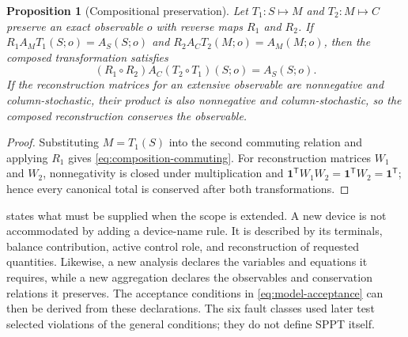 \documentclass[final,5p,times,twocolumn]{elsarticle}
\newtheorem{proposition}{Proposition}
\begin{document}
\begin{proposition}[Compositional preservation]
\label{prop:compositional-preservation}
Let $T_1:S\mapsto M$ and $T_2:M\mapsto C$ preserve an exact observable $o$
with reverse maps $R_1$ and $R_2$. If
$R_1A_M T_1(S;o)=A_S(S;o)$ and
$R_2A_C T_2(M;o)=A_M(M;o)$, then the composed transformation satisfies
\begin{equation}
 (R_1\circ R_2)A_C(T_2\circ T_1)(S;o)=A_S(S;o).
 \label{eq:composition-commuting}
\end{equation}
If the reconstruction matrices for an extensive observable are nonnegative and
column-stochastic, their product is also nonnegative and column-stochastic, so
the composed reconstruction conserves the observable.
\end{proposition}
\begin{proof}
Substituting $M=T_1(S)$ into the second commuting relation and applying $R_1$
gives \eqref{eq:composition-commuting}. For reconstruction matrices $W_1$ and
$W_2$, nonnegativity is closed under multiplication and
$\bm 1^{\mathsf T}W_1W_2=\bm 1^{\mathsf T}W_2=\bm 1^{\mathsf T}$; hence every
canonical total is conserved after both transformations.
\end{proof}

 states what must be supplied when the scope is extended.
A new device is not accommodated by adding a device-name rule. It is described
by its terminals, balance contribution, active control role, and reconstruction
of requested quantities. Likewise, a new analysis declares the variables and
equations it requires, while a new aggregation declares the observables and
conservation relations it preserves. The acceptance conditions in
\eqref{eq:model-acceptance} can then be derived from these declarations. The
six fault classes used later test selected violations of the general
conditions; they do not define SPPT itself.
\end{document}
